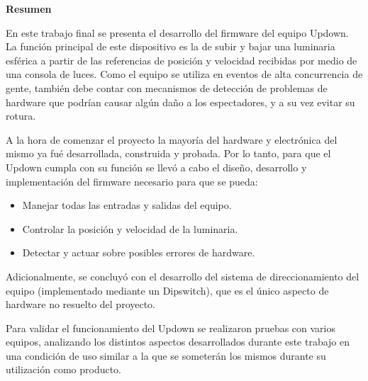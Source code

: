 \thispagestyle{empty}
\begin{center}

	\textbf{\huge Resumen }\\[1cm] 

\end{center}

En este trabajo final se presenta el desarrollo del firmware del equipo Updown. La función principal de este dispositivo es la de subir y bajar una luminaria esférica a partir de las referencias de posición y velocidad recibidas por medio de una consola de luces. Como el equipo se utiliza en eventos de alta concurrencia de gente, también debe contar con mecanismos de detección de problemas de hardware que podrían causar algún daño a los espectadores, y a su vez evitar su rotura.

A la hora de comenzar el proyecto la mayoría del hardware y electrónica del mismo ya fué desarrollada, construida y probada. Por lo tanto, para que el Updown cumpla con su función se llevó a cabo el diseño, desarrollo y implementación del firmware necesario para que se pueda:

\begin{itemize}
	\item Manejar todas las entradas y salidas del equipo.
	\item Controlar la posición y velocidad de la luminaria.
	\item Detectar y actuar sobre posibles errores de hardware.
\end{itemize}

Adicionalmente, se concluyó con el desarrollo del sistema de direccionamiento del equipo (implementado mediante un Dipswitch), que es el único aspecto de hardware no resuelto del proyecto.

Para validar el funcionamiento del Updown se realizaron pruebas con varios equipos, analizando los distintos aspectos desarrollados durante este trabajo en una condición de uso similar a la que se someterán los mismos durante su utilización como producto.



